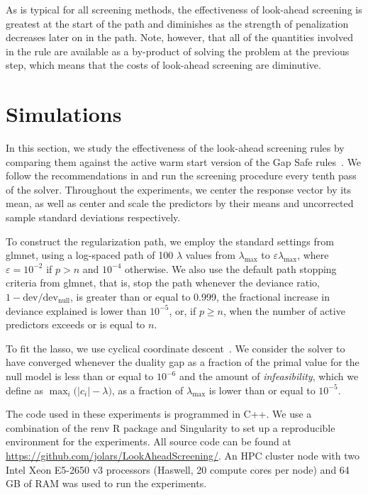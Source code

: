 \documentclass[b5paper,10pt,abstractoff,DIV=calc,headings=normal,twoside]{scrartcl}
\theoremstyle{plain}
\theoremstyle{definition}
\theoremstyle{remark}
\begin{document}
As is typical for all screening methods, the effectiveness of look-ahead
screening is greatest at the start of the path and diminishes as the strength
of penalization decreases later on in the path. Note, however, that all of the
quantities involved in the rule are available as a by-product of solving the
problem at the previous step, which means that the costs of look-ahead
screening are diminutive.

\section{Simulations}\label{seq:simulations}

In this section, we study the effectiveness of the look-ahead screening rules by
comparing them against the active warm start version of the Gap Safe
rules~\citep{fercoq2015,ndiaye2017}.  We follow the recommendations in
\citet{ndiaye2017} and run the screening procedure every tenth pass of the
solver.
Throughout the experiments, we center the response vector by its mean, as
well as center and scale the predictors by their means and uncorrected
sample standard deviations respectively.

To construct
the regularization path, we employ the standard settings from \textsf{glmnet},
using a log-spaced path of 100 \(\lambda\) values from \(\lambda_\text{max}\)
to \(\varepsilon \lambda_\text{max}\), where \(\varepsilon = 10^{-2}\) if
\(p > n\) and \(10^{-4}\) otherwise. We also use the default
path stopping criteria from \textsf{glmnet}, that is, stop the path whenever
the deviance ratio, \(1 - \text{dev}/\text{dev}_\text{null}\),
is greater than or equal to 0.999,
the fractional increase in deviance explained is lower than
\(10^{-5}\), or, if \(p \geq n\),
when the number of active predictors exceeds or is equal to
\(n\).

To fit the lasso, we
use cyclical coordinate descent~\cite{friedman2010}.
We consider the solver to have converged whenever
the duality gap as a fraction of the primal value
for the null model is less than or equal to \(10^{-6}\) and the amount of
\emph{infeasibility}, which we define as \(\max_i\big( |c_i| -
\lambda\big)\), as a fraction of \(\lambda_\text{max}\) is lower than or
equal to \(10^{-5}\).

The code used in these experiments is programmed in \textsf{C++}.
We use a combination of the \textsf{renv} R
package and Singularity to set up a
reproducible environment for the experiments. All
source code
can be found at \url{https://github.com/jolars/LookAheadScreening/}. An HPC
cluster node with two Intel Xeon E5-2650 v3 processors (Haswell, 20 compute
cores per node) and 64 GB of RAM was used to run the experiments.
\end{document}
